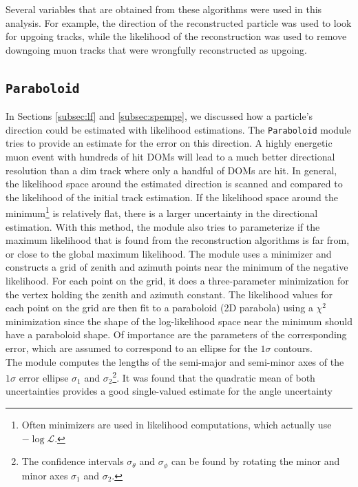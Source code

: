 \noindent Several variables that are obtained from these algorithms were used in this analysis. For example, the direction of the reconstructed particle was used to look for upgoing tracks, while the likelihood of the reconstruction was used to remove downgoing muon tracks that were wrongfully reconstructed as upgoing.

\subsection{\texttt{Paraboloid}}
\label{subsec:paraboloid}

In Sections \ref{subsec:lf} and \ref{subsec:spempe}, we discussed how a particle's direction could be estimated with likelihood estimations. The \texttt{Paraboloid} module tries to provide an estimate for the error on this direction. A highly energetic muon event with hundreds of hit DOMs will lead to a much better directional resolution than a dim track where only a handful of DOMs are hit. In general, the likelihood space around the estimated direction is scanned and compared to the likelihood of the initial track estimation. If the likelihood space around the minimum\footnote{Often minimizers are used in likelihood computations, which actually use $-\log \mathcal{L}$.} is relatively flat, there is a larger uncertainty in the directional estimation. With this method, the module also tries to parameterize if the maximum likelihood that is found from the reconstruction algorithms is far from, or close to the global maximum likelihood. The module uses a minimizer and constructs a grid of zenith and azimuth points near the minimum of the negative likelihood. For each point on the grid, it does a three-parameter minimization for the vertex holding the zenith and azimuth constant. The likelihood values for each point on the grid are then fit to a paraboloid (2D parabola) using a $\chi^2$ minimization since the shape of the log-likelihood space near the minimum should have a paraboloid shape. Of importance are the parameters of the corresponding error, which are assumed to correspond to an ellipse for the $1\sigma$ contours.\\

\noindent The module computes the lengths of the semi-major and semi-minor axes of the $1\sigma$ error ellipse $\sigma_1$ and $\sigma_2$\footnote{The confidence intervals $\sigma_\theta$ and $\sigma_\phi$ can be found by rotating the minor and minor axes $\sigma_1$ and $\sigma_2$.}. It was found that the quadratic mean of both uncertainties provides a good single-valued estimate for the angle uncertainty

